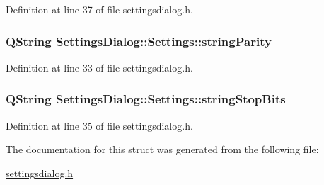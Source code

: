 Definition at line 37 of file settingsdialog.\+h.

\hypertarget{struct_settings_dialog_1_1_settings_aa2c662b2fb315f038e827d63d83b059b}{}
\subsubsection[{string\+Parity}]{\setlength{\rightskip}{0pt plus 5cm}Q\+String Settings\+Dialog\+::\+Settings\+::string\+Parity}\label{struct_settings_dialog_1_1_settings_aa2c662b2fb315f038e827d63d83b059b}


Definition at line 33 of file settingsdialog.\+h.

\hypertarget{struct_settings_dialog_1_1_settings_abde3c8410f779688ce6c2fcbbbb84f10}{}
\subsubsection[{string\+Stop\+Bits}]{\setlength{\rightskip}{0pt plus 5cm}Q\+String Settings\+Dialog\+::\+Settings\+::string\+Stop\+Bits}\label{struct_settings_dialog_1_1_settings_abde3c8410f779688ce6c2fcbbbb84f10}


Definition at line 35 of file settingsdialog.\+h.



The documentation for this struct was generated from the following file\+:\begin{DoxyCompactItemize}
\item 
\hyperlink{settingsdialog_8h}{settingsdialog.\+h}\end{DoxyCompactItemize}

